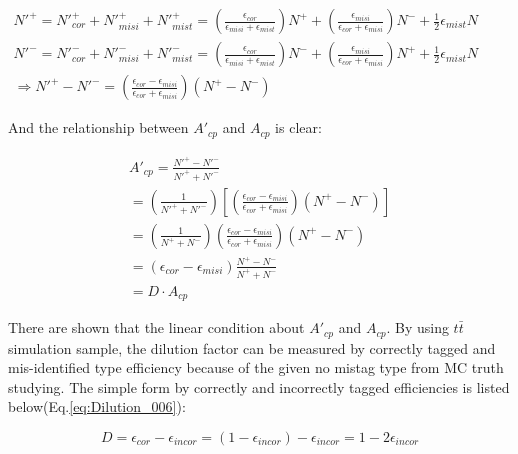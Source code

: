 		\begin{equation}
		\begin{split}
		N'^+ = N'^+_{cor} + N'^+_{misi} + N'^+_{mist} = (\frac{\epsilon_{cor}}{\epsilon_{misi} + \epsilon_{mist}})N^+ + (\frac{\epsilon_{misi}}{\epsilon_{cor} + \epsilon_{misi}})N^- + \frac{1}{2}\epsilon_{mist} N \\
		N'^- = N'^-_{cor} + N'^-_{misi} + N'^-_{mist} = (\frac{\epsilon_{cor}}{\epsilon_{misi} + \epsilon_{mist}})N^- + (\frac{\epsilon_{misi}}{\epsilon_{cor} + \epsilon_{misi}})N^+ + \frac{1}{2}\epsilon_{mist} N  \\
		\Rightarrow N'^+ - N'^- = (\frac{\epsilon_{cor}-\epsilon_{misi}}{\epsilon_{cor}+\epsilon_{misi}})(N^+ - N^-) \;\;\;\;\;\;\;\;\;\;\;\;\;\;\;\;\;\;\;\;\;\;\;\;\;\;\;\;\;\;\;\;\;\;\;\;\;\;\;\;\;\;\;\;\;\;\;\;\;\;\;\;\;\;\;\;\;\;\;\;\;\;
		\end{split}
		\label{eq:Dilution_004}
		\end{equation}
		\FloatBarrier

		And the relationship between $A'_{cp}$ and $A_{cp}$ is clear:

		\begin{equation}
		\begin{split}
		A'_{cp} = \frac{N'^+ - N'^-}{N'^+ + N'^-} \\
		= (\frac{1}{N'^+ + N'^-})[(\frac{\epsilon_{cor}-\epsilon_{misi}}{\epsilon_{cor}+\epsilon_{misi}})(N^+ - N^-)] \\
		= (\frac{1}{N^+ + N^-})(\frac{\epsilon_{cor}-\epsilon_{misi}}{\epsilon_{cor}+\epsilon_{misi}})(N^+ - N^-)\\
		= (\epsilon_{cor}-\epsilon_{misi})\frac{N^+ - N^-}{N^+ + N^-}\\
		= D \cdot A_{cp}
		\end{split}
		\label{eq:Dilution_005}
		\end{equation}
		\FloatBarrier

		There are shown that the linear condition about $A'_{cp}$ and $A_{cp}$. By using $t\bar{t}$ simulation sample, the dilution factor can be measured by correctly tagged and mis-identified type efficiency because of the given no mistag type from MC truth studying. The simple form by correctly and incorrectly tagged efficiencies is listed below(Eq.\ref{eq:Dilution_006}):

		\begin{equation}
		D = \epsilon_{cor} - \epsilon_{incor} = (1-\epsilon_{incor}) - \epsilon_{incor} = 1 - 2\epsilon_{incor}
		\label{eq:Dilution_006}
		\end{equation}
		\FloatBarrier

